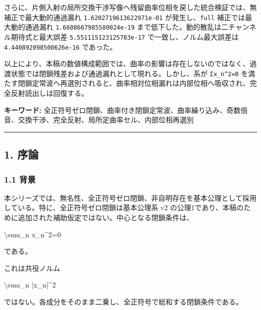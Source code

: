 \documentclass[
  a4paper,
]{article}
\newenvironment{Shaded}{}{}
\newcommand{\NormalTok}[1]{#1}
\begin{document}
さらに、片側入射の局所交換干渉写像へ残留曲率位相を戻した統合検証では、無補正で最大動的通過漏れ
\texttt{1.6202719613622971e-01} が発生し、\texttt{full}
補正では最大動的通過漏れ \texttt{1.6608667985580024e-19}
まで低下した。動的散乱は二チャンネル期待式と最大誤差
\texttt{5.551115123125783e-17} で一致し、ノルム最大誤差は
\texttt{4.440892098500626e-16} であった。

以上により、本稿の数値構成範囲では、曲率の影響は存在しないのではなく、過渡状態では閉鎖残差および通過漏れとして現れる。しかし、系が
\texttt{Σx\_n\^{}2=0}
を満たす閉鎖定常波へ再選別されると、曲率相対位相漏れは内部位相へ吸収され、完全反射読出しは回復する。

\textbf{キーワード:}
全正符号ゼロ閉鎖、曲率付き閉鎖定常波、曲率繰り込み、奇数倍音、交換干渉、完全反射、局所定曲率セル、内部位相再選別

\begin{center}\rule{0.5\linewidth}{0.5pt}\end{center}

\subsection{1. 序論}\label{ux5e8fux8ad6}

\subsubsection{1.1 背景}\label{ux80ccux666f}

本シリーズでは、無名性、全正符号ゼロ閉鎖、非自明存在を基本公理として採用している。特に、全正符号ゼロ閉鎖は基本公理系
v2
の公理1であり、本稿のために追加された補助仮定ではない。中心となる閉鎖条件は、

\begin{Shaded}
\begin{Highlighting}[]
\NormalTok{\textbackslash{}sum\_n x\_n\^{}2=0}
\end{Highlighting}
\end{Shaded}

である。

これは共役ノルム

\begin{Shaded}
\begin{Highlighting}[]
\NormalTok{\textbackslash{}sum\_n |x\_n|\^{}2}
\end{Highlighting}
\end{Shaded}

ではない。各成分をそのまま二乗し、全正符号で総和する閉鎖条件である。
\end{document}
